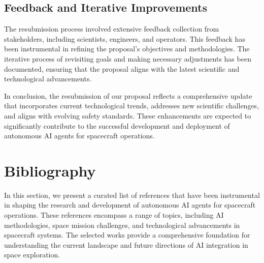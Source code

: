 \documentclass[a4paper,12pt]{article}
\begin{document}
\subsection{Feedback and Iterative Improvements}

The resubmission process involved extensive feedback collection from stakeholders, including scientists, engineers, and operators. This feedback has been instrumental in refining the proposal's objectives and methodologies. The iterative process of revisiting goals and making necessary adjustments has been documented, ensuring that the proposal aligns with the latest scientific and technological advancements.

In conclusion, the resubmission of our proposal reflects a comprehensive update that incorporates current technological trends, addresses new scientific challenges, and aligns with evolving safety standards. These enhancements are expected to significantly contribute to the successful development and deployment of autonomous AI agents for spacecraft operations.



\section{Bibliography}

In this section, we present a curated list of references that have been instrumental in shaping the research and development of autonomous AI agents for spacecraft operations. These references encompass a range of topics, including AI methodologies, space mission challenges, and technological advancements in spacecraft systems. The selected works provide a comprehensive foundation for understanding the current landscape and future directions of AI integration in space exploration.
\end{document}
